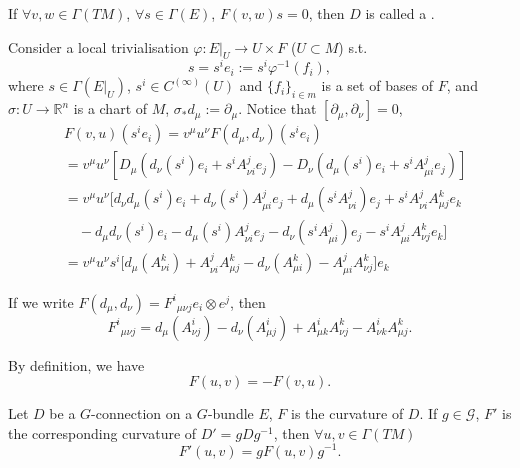 \documentclass[openany, oneside, a5paper]{book}
\begin{document}
If $\forall v, w \in \Gamma(TM)$, $\forall s \in \Gamma(E)$, $F(v, w) s = 0$, then $D$ is called a .

Consider a local trivialisation $\varphi \colon E|_U \to U \times F$ ($U \subset M$) s.t.\ 
\begin{equation}
    s = s^i e_i := s^i\varphi^{-1}(f_i),
\end{equation}
where $s \in \Gamma(E|_U)$, $s^i \in C^{(\infty)}(U)$ and $\{f_i\}_{i \in m}$ is a set of bases of $F$,
and $\sigma \colon U \to \mathbb R^n$ is a chart of $M$, $\sigma_* d_\mu := \partial_\mu$.
Notice that $[\partial_\mu, \partial_\nu] = 0$,
\begin{equation}
    \begin{aligned}
        &F(v, u) (s^i e_i) 
        = v^\mu u^\nu F(d_\mu, d_\nu) (s^i e_i)
        \\
        &= v^\mu u^\nu [
            D_\mu (d_\nu(s^i)e_i + s^i A_{\nu i}^j e_j)
            - D_\nu (d_\mu(s^i)e_i + s^i A_{\mu i}^j e_j)
        ]
        \\
        &= v^\mu u^\nu \big[
            d_\nu d_\mu (s^i) e_i + d_\nu (s^i) A_{\mu i}^j e_j
            + d_\mu(s^i A_{\nu i}^j) e_j + s^i A_{\nu i}^j A_{\mu j}^k e_k
        \\
        &\quad
        - d_\mu d_\nu(s^i) e_i - d_\mu(s^i) A_{\nu i}^j e_j
        - d_\nu(s^i A_{\mu i}^j) e_j - s^i A_{\mu i}^j A_{\nu j}^k e_k
        \big]
        \\
        &= v^\mu u^\nu s^i\big[ 
            d_\mu (A_{\nu i}^k) + A_{\nu i}^j A_{\mu j}^k
            - d_\nu (A_{\mu i}^k) - A_{\mu i}^j A_{\nu j}^k 
        \big] e_k
    \end{aligned}
\end{equation}

If we write $F(d_\mu, d_\nu) = {F^i}_{\mu\nu j} e_i \otimes e^j$,
then
\begin{equation}
    {F^i}_{\mu\nu j} = d_\mu (A_{\nu j}^i) - d_\nu (A_{\mu j}^i) + A_{\mu k}^i A_{\nu j}^k - A_{\nu k}^i A_{\mu j}^k.
\end{equation}

By definition, we have
\begin{equation}
    F(u, v) = - F(v, u).
\end{equation}

\begin{theorem}
    Let $D$ be a $G$-connection on a $G$-bundle $E$, $F$ is the curvature of $D$.
    If $g \in \mathcal G$, $F'$ is the corresponding curvature of $D' = g D g^{-1}$, 
    then $\forall u, v \in \Gamma(TM)$
    \begin{equation}
        F'(u, v) = g F(u, v) g^{-1}.
    \end{equation}
\end{theorem}
\end{document}
